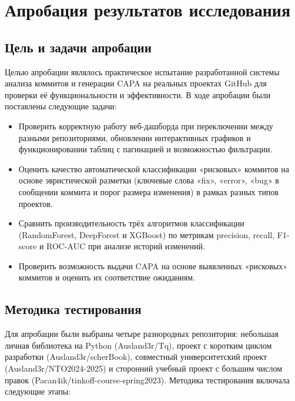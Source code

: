\chapter{Апробация результатов исследования} \label{ch4}

\section{Цель и задачи апробации} \label{ch4:sec1}
Целью апробации являлось практическое испытание разработанной системы анализа коммитов и генерации CAPA на реальных проектах GitHub для проверки её функциональности и эффективности. В ходе апробации были поставлены следующие задачи:

\begin{itemize}
	\item Проверить корректную работу веб-дашборда при переключении между разными репозиториями, обновлении интерактивных графиков и функционировании таблиц с пагинацией и возможностью фильтрации.
	\item Оценить качество автоматической классификации «рисковых» коммитов на основе эвристической разметки (ключевые слова «fix», «error», «bug» в сообщении коммита и порог размера изменения) в рамках разных типов проектов.
	\item Сравнить производительность трёх алгоритмов классификации (RandomForest, DeepForest и XGBoost) по метрикам precision, recall, F1-score и ROC-AUC при анализе историй изменений.
	\item Проверить возможность выдачи CAPA на основе выявленных «рисковых» коммитов и оценить их соответствие ожиданиям.
\end{itemize}


\section{Методика тестирования} \label{ch4:sec2}
Для апробации были выбраны четыре разнородных репозитория: небольшая личная библиотека на Python (Ausland3r/Tq), проект с коротким циклом разработки (Ausland3r/scherBook), совместный университетский проект (Ausland3r/NTO2024-2025) и сторонний учебный проект с большим числом правок (Pacan4ik/tinkoff-course-spring2023). Методика тестирования включала следующие этапы:

